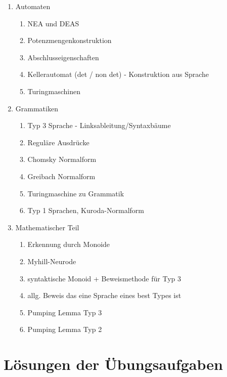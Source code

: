 \documentclass[12pt]{scrartcl}
\begin{document}
\begin{enumerate}
	\item Automaten
		\begin{enumerate}
			\item NEA und DEAS
			\item Potenzmengenkonstruktion
			\item Abschlusseigenschaften
			\item Kellerautomat (det / non det) - Konstruktion aus Sprache 
			\item Turingmaschinen 
		\end{enumerate}
		
	\item Grammatiken
		\begin{enumerate}
			\item Typ 3 Sprache - Linksableitung/Syntaxbäume
			\item Reguläre Ausdrücke
			\item Chomsky Normalform
			\item Greibach Normalform
			\item Turingmaschine zu Grammatik
			\item Typ 1 Sprachen, Kuroda-Normalform
		\end{enumerate}
		
		\item Mathematischer Teil
		\begin{enumerate}
			\item Erkennung durch Monoide 
			\item Myhill-Neurode
			\item syntaktische Monoid + Beweismethode für Typ 3
			\item allg. Beweis das eine Sprache eines best Types ist 
			\item Pumping Lemma Typ 3
			\item Pumping Lemma Typ 2
		\end{enumerate}
\end{enumerate}

\newpage

\section{Lösungen der Übungsaufgaben}
	
\end{document}
